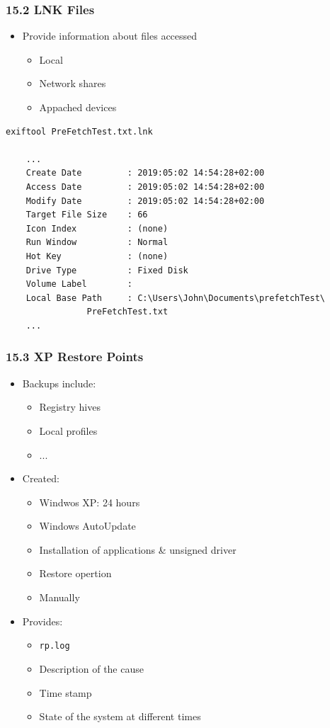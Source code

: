 \begin{frame}[fragile]
  \frametitle{15.2 LNK Files}
    \begin{itemize}
        \item Provide information about files accessed
        \begin{itemize}
            \item Local
            \item Network shares
            \item Appached devices
        \end{itemize}
    \end{itemize}
  \begin{lstlisting}[basicstyle=\tiny]
exiftool PreFetchTest.txt.lnk

	...
	Create Date         : 2019:05:02 14:54:28+02:00
	Access Date         : 2019:05:02 14:54:28+02:00
	Modify Date         : 2019:05:02 14:54:28+02:00
	Target File Size    : 66
	Icon Index          : (none)
	Run Window          : Normal
	Hot Key             : (none)
	Drive Type          : Fixed Disk
	Volume Label        :
	Local Base Path     : C:\Users\John\Documents\prefetchTest\
				PreFetchTest.txt
	...
  \end{lstlisting}
\end{frame}


\begin{frame}[fragile]
  \frametitle{15.3 XP Restore Points}
    \begin{itemize}
        \item Backups include:
        \begin{itemize}
	    \item Registry hives
            \item Local profiles
            \item ...
        \end{itemize}
        \item Created:
        \begin{itemize}
            \item Windwos XP: 24 hours
            \item Windows AutoUpdate
	    \item Installation of applications \& unsigned driver
            \item Restore opertion
            \item Manually
        \end{itemize}
        \item Provides:
        \begin{itemize}
	    \item \texttt{rp.log}
            \item Description of the cause
            \item Time stamp
            \item State of the system at different times
        \end{itemize}
    \end{itemize}
\end{frame}


